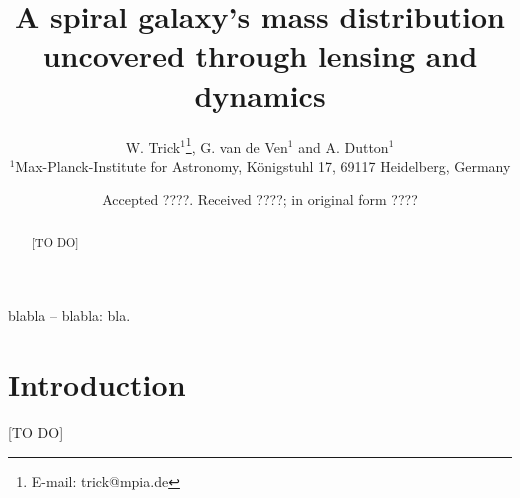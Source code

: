 \documentclass[useAMS,usenatbib]{mn2e}
\title[A spiral galaxy's mass distribution uncovered]{A spiral galaxy's mass distribution uncovered through lensing and dynamics}
\author[W. Trick, G. van de Ven and A. Dutton]{W. Trick$^{1}$\thanks{E-mail:
trick@mpia.de}, G. van de Ven$^{1}$ and A. Dutton$^{1}$\\
$^{1}$Max-Planck-Institute for Astronomy, K\"{o}nigstuhl 17, 69117 Heidelberg, Germany}
\begin{document}
\date{Accepted ????. Received ????; in original form ????}

\pagerange{\pageref{firstpage}--\pageref{lastpage}} 

\maketitle

\label{firstpage}

\begin{abstract}
[TO DO]
\end{abstract}

\begin{keywords}
blabla -- blabla: bla.
\end{keywords}

\section{Introduction}

[TO DO]
\end{document}
